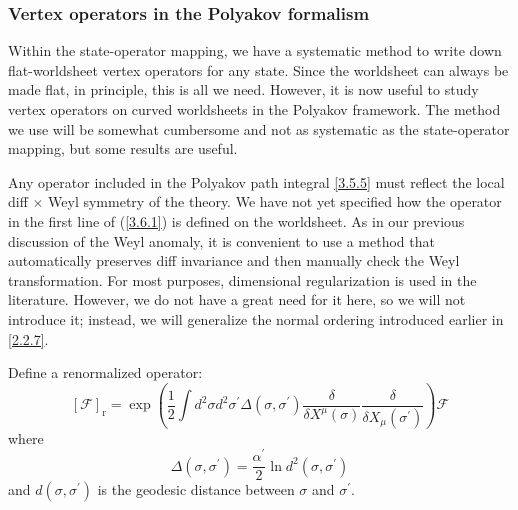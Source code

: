 \subsubsection*{\Large Vertex operators in the Polyakov formalism}

Within the state-operator mapping, we have a systematic method to write down flat-worldsheet vertex operators for any state. Since the worldsheet can always be made flat, in principle, this is all we need. However, it is now useful to study vertex operators on curved worldsheets in the Polyakov framework. The method we use will be somewhat cumbersome and not as systematic as the state-operator mapping, but some results are useful.

Any operator included in the Polyakov path integral \eqref{3.5.5} must reflect the local diff $\times$ Weyl symmetry of the theory. We have not yet specified how the operator in the first line of (\ref{3.6.1}) is defined on the worldsheet. As in our previous discussion of the Weyl anomaly, it is convenient to use a method that automatically preserves diff invariance and then manually check the Weyl transformation. For most purposes, dimensional regularization is used in the literature. However, we do not have a great need for it here, so we will not introduce it; instead, we will generalize the normal ordering introduced earlier in \eqref{2.2.7}.

Define a renormalized operator:
\begin{equation}\label{3.6.5}
	[\mathscr{F}]_{\mathrm{r}}=\exp \left(\frac{1}{2} \int d^{2} \sigma d^{2} \sigma^{\prime} \Delta\left(\sigma, \sigma^{\prime}\right) \frac{\delta}{\delta X^{\mu}(\sigma)} \frac{\delta}{\delta X_{\mu}\left(\sigma^{\prime}\right)}\right) \mathscr{F}
\end{equation}
where
\begin{equation}
	\Delta\left(\sigma, \sigma^{\prime}\right)=\frac{\alpha^{\prime}}{2} \ln d^{2}\left(\sigma, \sigma^{\prime}\right)
\end{equation}
and $d\left(\sigma, \sigma^{\prime}\right)$ is the geodesic distance between $\sigma$ and $\sigma^{\prime}$.

